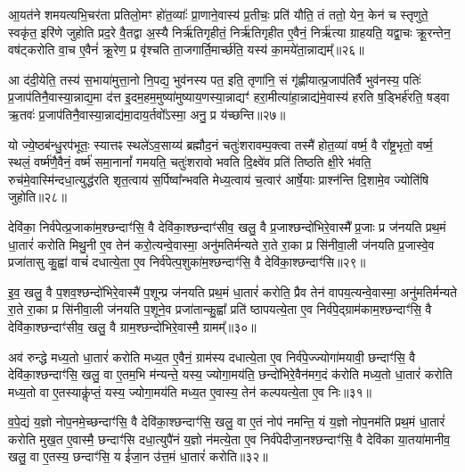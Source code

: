 आ॒यत॑ने शमयत्यभि॒चर॑ता प्रतिलो॒मꣳ हो॑त॒व्याः᳚ प्रा॒णाने॒वास्य॑ प्र॒तीचः॒ प्रति॑ यौति॒ तं ततो॒ येन॒ केन॑ च स्तृणुते॒ स्वकृ॑त॒ इरि॑णे जुहोति प्रद॒रे वै॒तद्वा अ॒स्यै निर्\mbox{}ऋ॑तिगृहीतं॒ निर्\mbox{}ऋ॑तिगृहीत ए॒वैनं॒ निर्\mbox{}ऋ॑त्या ग्राहयति॒ यद्वा॒चः क्रू॒रन्तेन॒ वष॑ट्करोति वा॒च ए॒वैनं॑ क्रू॒रेण॒ प्र वृ॑श्चति ता॒जगार्ति॒मार्च्छ॑ति॒ यस्य॑ का॒मये॑ता॒न्नाद्यम्᳚॥२६॥

आ द॑दी॒येति॒ तस्य॑ स॒भाया॑मुत्ता॒नो नि॒पद्य॒ भुव॑नस्य पत॒ इति॒ तृणा॑नि॒ सं गृ॑ह्णीयात्प्र॒जाप॑तिर्वै भुव॑नस्य॒ पतिः॑ प्र॒जाप॑तिनै॒वास्या॒न्नाद्य॒मा द॑त्त इ॒दम॒हम॒मुष्या॑मुष्याय॒णस्या॒न्नाद्यꣳ॑ हरा॒मीत्या॑हा॒न्नाद्य॑मे॒वास्य॑ हरति ष॒ड्भिर्\mbox{}ह॑रति॒ षड्वा ऋ॒तवः॑ प्र॒जाप॑तिनै॒वास्या॒न्नाद्य॑मा॒दाय॒र्तवो᳚\-ऽस्मा॒ अनु॒ प्र य॑च्छन्ति॥२७॥

यो ज्ये॒ष्ठब॑न्धु॒रप॑भूतः॒ स्यात्तꣴ स्थले॑\-ऽव॒साय्य॑ ब्रह्मौद॒नं चतुः॑शरावम्प॒क्त्वा तस्मै॑ होत॒व्या॑ वर्ष्म॒ वै रा᳚ष्ट्र॒भृतो॒ वर्ष्म॒ स्थलं॒ वर्ष्म॑णै॒वैनं॒ वर्ष्म॑ समा॒नानां᳚ गमयति॒ चतुः॑शरावो भवति दि॒क्ष्वे॑व प्रति॑ तिष्ठति क्षी॒रे भ॑वति॒ रुच॑मे॒वास्मि॑\-न्दधा॒त्युद्ध॑रति शृत॒त्वाय॑ स॒र्पिष्वा᳚न्भवति मेध्य॒त्वाय॑ च॒त्वार॑ आर्\mbox{}षे॒याः प्राश्न॑न्ति दि॒शामे॒व ज्योति॑षि जुहोति॥२८॥

{\anuvakamend[{ग्रा॒मी यु॑नक्ती॒ध्मः स्व ए॒वैना॑न॒न्नाद्यं॑ यच्छ॒न्त्येका॒न्नप॑ञ्चा॒शच्च॑॥८॥}]}

देवि॑का॒ निर्व॑पेत्प्र॒जाका॑म॒श्छन्दाꣳ॑सि॒ वै देवि॑का॒श्छन्दाꣳ॑सीव॒ खलु॒ वै प्र॒जाश्छन्दो॑भिरे॒वास्मै᳚ प्र॒जाः प्र ज॑नयति प्रथ॒मं धा॒तारं॑ करोति मिथु॒नी ए॒व तेन॑ करो॒त्यन्वे॒वास्मा॒ अनु॑मतिर्मन्यते रा॒ते रा॒का प्र सि॑नीवा॒ली ज॑नयति प्र॒जास्वे॒व प्रजा॑तासु कु॒ह्वा॑ वाचं॑ दधात्ये॒ता ए॒व निर्व॑पेत्प॒शुका॑म॒श्छन्दाꣳ॑सि॒ वै देवि॑का॒श्छन्दाꣳ॑सि॥२९॥

इ॒व॒ खलु॒ वै प॒शव॒श्छन्दो॑भिरे॒वास्मै॑ प॒शून्प्र ज॑नयति प्रथ॒मं धा॒तारं॑ करोति॒ प्रैव तेन॑ वापय॒त्यन्वे॒वास्मा॒ अनु॑मतिर्मन्यते रा॒ते रा॒का प्र सि॑नीवा॒ली ज॑नयति प॒शूने॒व प्रजा॑तान्कु॒ह्वा᳚ प्रति॑ ष्ठापयत्ये॒ता ए॒व निर्व॑पे॒द्ग्राम॑काम॒श्छन्दाꣳ॑सि॒ वै देवि॑का॒श्छन्दाꣳ॑सीव॒ खलु॒ वै ग्राम॒श्छन्दो॑भिरे॒वास्मै॒ ग्रामम्᳚॥३०॥

अव॑ रुन्द्धे मध्य॒तो धा॒तारं॑ करोति मध्य॒त ए॒वैनं॒ ग्राम॑स्य दधात्ये॒ता ए॒व निर्व॑पे॒ज्ज्योगा॑मयावी॒ छन्दाꣳ॑सि॒ वै देवि॑का॒श्छन्दाꣳ॑सि॒ खलु॒ वा ए॒तम॒भि म॑न्यन्ते॒ यस्य॒ ज्योगा॒मय॑ति॒ छन्दो॑भिरे॒वैन॑मग॒दं क॑रोति मध्य॒तो धा॒तारं॑ करोति मध्य॒तो वा ए॒तस्याकॢ॑प्तं॒ यस्य॒ ज्योगा॒मय॑ति मध्य॒त ए॒वास्य॒ तेन॑ कल्पयत्ये॒ता ए॒व निः॥३१॥

व॒पे॒द्यं य॒ज्ञो नोप॒नमे॒च्छन्दाꣳ॑सि॒ वै देवि॑का॒श्छन्दाꣳ॑सि॒ खलु॒ वा ए॒तं नोप॑ नमन्ति॒ यं य॒ज्ञो नोप॒नम॑ति प्रथ॒मं धा॒तारं॑ करोति मुख॒त ए॒वास्मै॒ छन्दाꣳ॑सि दधा॒त्युपै॑नं य॒ज्ञो न॑मत्ये॒ता ए॒व निर्व॑पेदीजा॒नश्छन्दाꣳ॑सि॒ वै देवि॑का या॒तया॑मानीव॒ खलु॒ वा ए॒तस्य॒ छन्दाꣳ॑सि॒ य ई॑जा॒न उ॑त्त॒मं धा॒तारं॑ करोति॥३२॥

